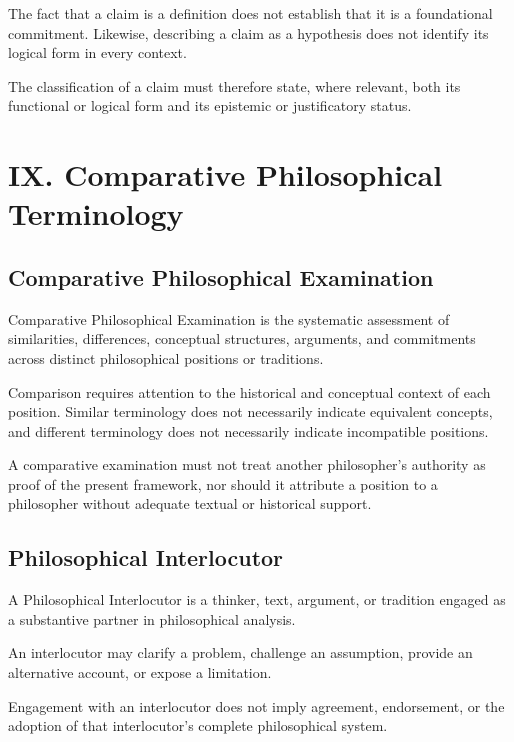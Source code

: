 The fact that a claim is a definition does not establish that it
is a foundational commitment. Likewise, describing a claim as
a hypothesis does not identify its logical form in every context.

The classification of a claim must therefore state, where relevant,
both its functional or logical form and its epistemic or justificatory
status.



\section*{IX. Comparative Philosophical Terminology}


\subsection*{Comparative Philosophical Examination}

Comparative Philosophical Examination is the systematic assessment
of similarities, differences, conceptual structures, arguments,
and commitments across distinct philosophical positions or traditions.

Comparison requires attention to the historical and conceptual
context of each position. Similar terminology does not necessarily
indicate equivalent concepts, and different terminology does not
necessarily indicate incompatible positions.

A comparative examination must not treat another philosopher's
authority as proof of the present framework, nor should it attribute
a position to a philosopher without adequate textual or historical
support.


\subsection*{Philosophical Interlocutor}

A Philosophical Interlocutor is a thinker, text, argument, or
tradition engaged as a substantive partner in philosophical analysis.

An interlocutor may clarify a problem, challenge an assumption,
provide an alternative account, or expose a limitation.

Engagement with an interlocutor does not imply agreement, endorsement,
or the adoption of that interlocutor's complete philosophical system.


